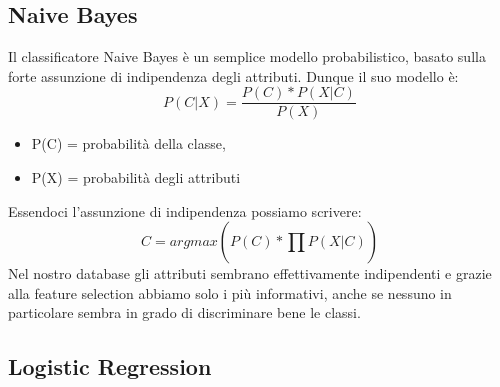 \documentclass[a4paper, 12p]{report}
\begin{document}
	\subsection{Naive Bayes}
	Il classificatore Naive Bayes è un semplice modello probabilistico, basato sulla forte assunzione di indipendenza degli attributi. Dunque il suo modello è: 
	\begin{equation}
	P(C|X) = \frac{P(C)*P(X|C)}{P(X)}
	\end{equation}
	\begin{itemize}
		\item P(C) = probabilità della classe,
		\item P(X) = probabilità degli attributi
	\end{itemize}
	Essendoci l'assunzione di indipendenza possiamo scrivere:
	\begin{equation}
	C = argmax (P(C)*\prod_{}{}{P(X|C)})
	\end{equation}
	Nel nostro database gli attributi sembrano effettivamente indipendenti e grazie alla feature selection abbiamo solo i più informativi, anche se nessuno in particolare sembra in grado di discriminare bene le classi.
	\subsection{Logistic Regression}
	
\end{document}
